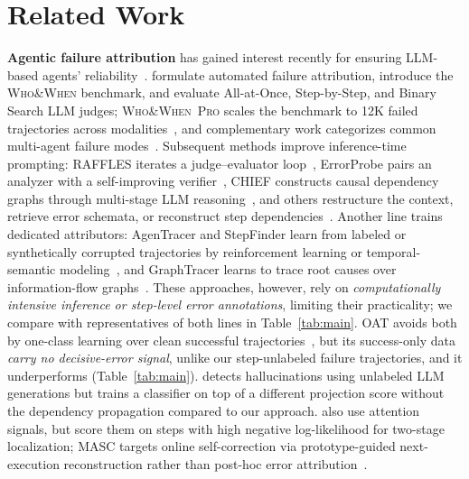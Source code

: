 \section{Related Work}
\label{sec:related}

\textbf{Agentic failure attribution} has gained interest recently for ensuring LLM-based agents' reliability~\citep{qi2026trajdebug,barke2026agentrx}.
\citet{whoandwhen} formulate automated failure attribution, introduce the
\textsc{Who\&When} benchmark, and evaluate All-at-Once, Step-by-Step, and Binary Search
LLM judges; \textsc{Who\&When~Pro} scales the benchmark to 12K failed trajectories
across modalities~\citep{liu2026wwpro}, and complementary work categorizes
common multi-agent failure
modes~\citep{mast,deshpande2025trail,raj2026model,zhu2025agentdebug}.
Subsequent methods improve inference-time prompting: RAFFLES iterates a
judge--evaluator loop~\citep{raffles}, ErrorProbe pairs an analyzer with a
self-improving verifier~\citep{errorprobe}, CHIEF constructs causal dependency
graphs through multi-stage LLM reasoning~\citep{chief}, and others
restructure the context, retrieve error schemata, or reconstruct step
dependencies~\citep{echo,correct,bakish2026adaptive,falat}. Another line
trains dedicated attributors: AgenTracer and StepFinder learn from labeled or
synthetically corrupted trajectories by reinforcement learning or
temporal-semantic modeling~\citep{agentracer,zhu2026stepfinder}, and
GraphTracer learns to trace root causes over information-flow
graphs~\citep{graphtracer}. These approaches, however, rely on
\textit{computationally intensive inference or step-level error annotations},
limiting their practicality; we compare with representatives of both lines in
Table~\ref{tab:main}. OAT avoids both by one-class learning over clean
successful trajectories~\citep{oat}, but its success-only data \textit{carry
no decisive-error signal}, unlike our step-unlabeled failure trajectories,
and it underperforms \soap (Table~\ref{tab:main}).  \citet{du2024haloscope} detects hallucinations using unlabeled LLM generations but trains a classifier on top of a different projection score without the dependency propagation compared to our approach. \citet{masprism} also use
attention signals, but score them on steps with high negative log-likelihood
for two-stage localization; MASC targets online self-correction via
prototype-guided next-execution reconstruction rather than post-hoc
error attribution~\citep{shen2025masc}.

